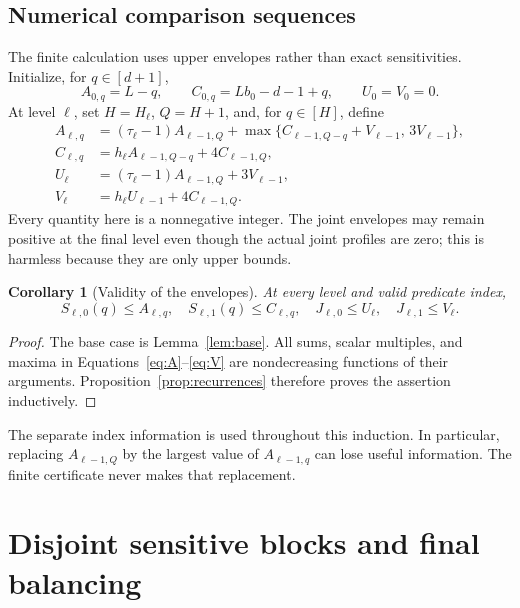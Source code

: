 \documentclass[11pt]{article}
\newtheorem{corollary}[theorem]{Corollary}
\theoremstyle{definition}
\theoremstyle{remark}
\begin{document}
\subsection{Numerical comparison sequences}

The finite calculation uses upper envelopes rather than exact
sensitivities.  Initialize, for $q\in[d+1]$,
\begin{equation}
 A_{0,q}=L-q,\qquad C_{0,q}=Lb_0-d-1+q,
 \qquad U_0=V_0=0.
 \label{eq:initial-envelopes}
\end{equation}
At level $\ell$, set $H=H_\ell$, $Q=H+1$, and, for $q\in[H]$,
define
\begin{align}
 A_{\ell,q}
  &=(\tau_\ell-1)A_{\ell-1,Q}
       +\max\{C_{\ell-1,Q-q}+V_{\ell-1},\,3V_{\ell-1}\},
 \label{eq:A}\\
 C_{\ell,q}
  &=h_\ell A_{\ell-1,Q-q}+4C_{\ell-1,Q},
 \label{eq:C}\\
 U_\ell
  &=(\tau_\ell-1)A_{\ell-1,Q}+3V_{\ell-1},
 \label{eq:U}\\
 V_\ell
  &=h_\ell U_{\ell-1}+4C_{\ell-1,Q}.
 \label{eq:V}
\end{align}
Every quantity here is a nonnegative integer.  The joint envelopes may
remain positive at the final level even though the actual joint profiles
are zero; this is harmless because they are only upper bounds.

\begin{corollary}[Validity of the envelopes]
\label{cor:envelopes}
At every level and valid predicate index,
\[
 S_{\ell,0}(q)\le A_{\ell,q},\quad
 S_{\ell,1}(q)\le C_{\ell,q},\quad
 J_{\ell,0}\le U_\ell,\quad J_{\ell,1}\le V_\ell.
\]
\end{corollary}

\begin{proof}
The base case is Lemma~\ref{lem:base}.  All sums, scalar multiples,
and maxima in Equations~\eqref{eq:A}--\eqref{eq:V} are nondecreasing
functions of their arguments.  Proposition~\ref{prop:recurrences}
therefore proves the assertion inductively.
\end{proof}

The separate index information is used throughout this induction.  In
particular, replacing $A_{\ell-1,Q}$ by the largest value of
$A_{\ell-1,q}$ can lose useful information.  The finite certificate
never makes that replacement.

\section{Disjoint sensitive blocks and final balancing}
\label{sec:blocks}
\end{document}
